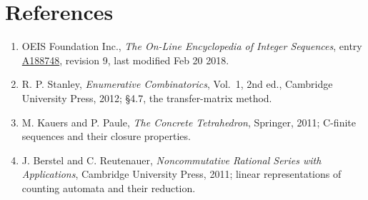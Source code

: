 \documentclass[11pt]{article}
\theoremstyle{definition}
\begin{document}
\section{References}

\begin{enumerate}

\item OEIS Foundation Inc., \emph{The On-Line Encyclopedia of Integer Sequences}, entry \href{https://oeis.org/A188748}{A188748}, revision 9, last modified Feb 20 2018.

\item R. P. Stanley, \emph{Enumerative Combinatorics}, Vol.~1, 2nd ed., Cambridge University Press, 2012; \S4.7, the transfer-matrix method.

\item M. Kauers and P. Paule, \emph{The Concrete Tetrahedron}, Springer, 2011; C-finite sequences and their closure properties.

\item J. Berstel and C. Reutenauer, \emph{Noncommutative Rational Series with Applications}, Cambridge University Press, 2011; linear representations of counting automata and their reduction.

\end{enumerate}
\end{document}
